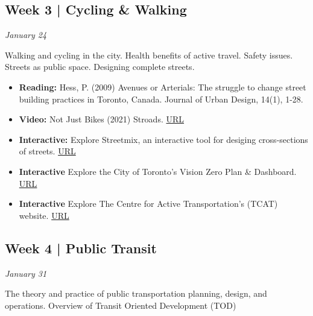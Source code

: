 \documentclass[11pt]{article}
\begin{document}



	\subsection*{Week 3 | Cycling \& Walking}
	
	\textit{January 24}
	
	Walking and cycling in the city. Health benefits of active travel. Safety issues. Streets as public space. Designing complete streets.
	
	\begin{itemize}
		\item \textbf{Reading:} Hess, P. (2009) Avenues or Arterials: The struggle to change street building practices in Toronto, Canada. Journal of Urban Design, 14(1), 1-28.
		
		\item \textbf{Video:} Not Just Bikes (2021) Stroads. \href{https://www.youtube.com/watch?v=ORzNZUeUHAM}{URL}
		
		\item \textbf{Interactive:} Explore Streetmix, an interactive tool for desiging cross-sections of streets. \href{https://streetmix.net}{URL}
		
		\item \textbf{Interactive} Explore the City of Toronto's Vision Zero Plan \& Dashboard. \href{https://www.toronto.ca/services-payments/streets-parking-transportation/road-safety/vision-zero/vision-zero-dashboard/}{URL}
		
		\item \textbf{Interactive} Explore The Centre for Active Transportation's (TCAT) website. \href{https://www.tcat.ca/}{URL}
		
	\end{itemize}
	
	
	

	

		
	\subsection*{Week 4 | Public Transit}
	
	\textit{January 31}
	
	The theory and practice of public transportation planning, design, and operations. Overview of Transit Oriented Development (TOD)
	
\end{document}
